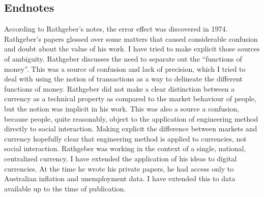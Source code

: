 
\subsection{Endnotes}

According to Rathgeber's notes, the error effect was discovered in 1974. Rathgeber's papers glossed
over some matters that caused considerable confusion and doubt about the value of his work. I have
tried to make explicit those sources of ambiguity. Rathgeber discusses the need to separate out the
``functions of money''. This was a source of confusion and lack of precision, which I tried to deal
with using the notion of transactions as a way to delineate the different functions of money.
Rathgeber did not make a clear distinction between a currency as a technical property as compared
to the market behaviour of people, but the notion was implicit in his work.  This was also a source
a confusion, because people, quite reasonably, object to the application of engineering method
directly to social interaction. Making explicit the difference between markets and currency
hopefully clear that engineering method is applied to currencies, not social interaction. Rathgeber
was working in the context of a single, national, centralized currency. I have extended the
application of his ideas to digital currencies.  At the time he wrote his private papers, he had
access only to Australian inflation and unemployment data. I have extended this to data available up
to the time of publication.





